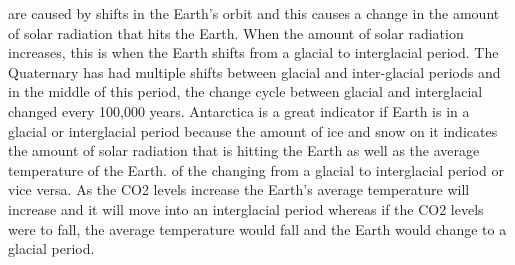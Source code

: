         \ddd {} are caused by shifts in the Earth's orbit and this causes a change in the amount of solar radiation that hits the Earth. When the amount of solar radiation increases, this is when the Earth shifts from a glacial to interglacial period. The Quaternary has had multiple shifts between glacial and inter-glacial periods and in the middle of this period, the change cycle between glacial and interglacial changed every 100,000 years. 
        \ddd Antarctica is a great indicator if Earth is in a glacial or interglacial period because the amount of ice and snow on it indicates the amount of solar radiation that is hitting the Earth as well as the average temperature of the Earth.
        \ddd {} of the changing from a glacial to interglacial period or vice versa. As the CO2 levels increase the Earth's average temperature will increase and it will move into an interglacial period whereas if the CO2 levels were to fall, the average temperature would fall and the Earth would change to a glacial period.